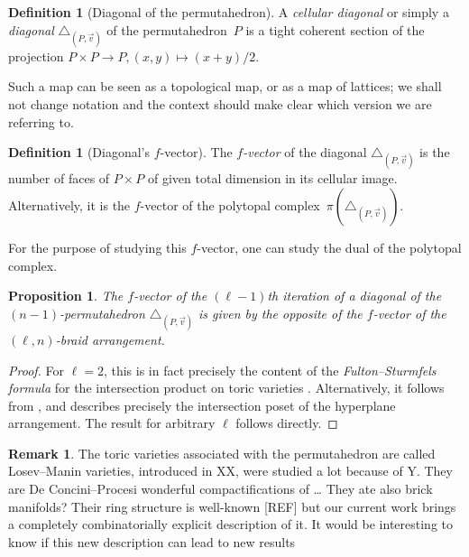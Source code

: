 \documentclass{amsart}
\newcommand{\Guillaume}[1]{\todo[color=magenta!30]{\rm #1 \\ \hfill --- G.}}
\newtheorem{proposition}[theorem]{Proposition}
\theoremstyle{definition}
\newtheorem{definition}[theorem]{Definition}
\newtheorem{remark}[theorem]{Remark}
\begin{document}
\begin{definition}[Diagonal of the permutahedron]
    \label{def:diagonal}
    A \emph{cellular diagonal} or simply a \emph{diagonal} $\triangle_{(P,\vec v)}$ of the permutahedron~$P$ is a tight coherent section of the projection $P \times P \to P, (x,y) \mapsto (x+y)/2$.
\end{definition}

Such a map can be seen as a topological map, or as a map of lattices; we shall not change notation and the context should make clear which version we are referring to.

\begin{definition}[Diagonal's $f$-vector]
    The \emph{$f$-vector} of the diagonal $\triangle_{(P,\vec v)}$ is the number of faces of $P\times P$ of given total dimension in its cellular image.
    Alternatively, it is the $f$-vector of the polytopal complex~$\pi (\triangle_{(P,\vec v)})$.
\end{definition}

For the purpose of studying this $f$-vector, one can study the dual of the polytopal complex.

\begin{proposition}
    The $f$-vector of the $(\ell-1)$th iteration of a diagonal of the $(n-1)$-permutahedron $\triangle_{(P,\vec v)}$ is given by the opposite of the $f$-vector of the $(\ell,n)$-braid arrangement.
\end{proposition}

\begin{proof}
    For $\ell=2$, this is in fact precisely the content of the \emph{Fulton--Sturmfels formula} for the intersection product on toric varieties \cite[Theorem 4.2]{fultonIntersectionTheoryToric1997a}.
    Alternatively, it follows from \cite[Proposition 1.3]{LA21}, and \cite[Corollary 1.4]{LA21} describes precisely the intersection poset of the hyperplane arrangement.
    The result for arbitrary $\ell$ follows directly. 
\end{proof}

\begin{remark} \Guillaume{completer et mettre dans l'intro}
    The toric varieties associated with the permutahedron are called Losev--Manin varieties, introduced in XX, were studied a lot because of Y.
    They are De Concini--Procesi wonderful compactifications of \dots
    They ate also brick manifolds?
    Their ring structure is well-known [REF] but our current work brings a completely combinatorially explicit description of it. 
    It would be interesting to know if this new description can lead to new results
\end{remark}
\end{document}
